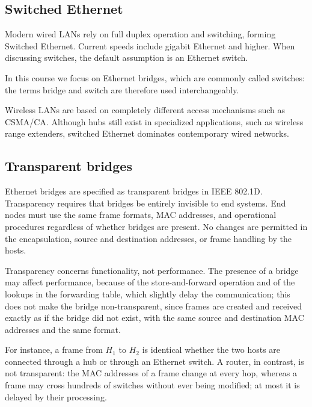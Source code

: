 \subsection{Switched Ethernet}

Modern wired LANs rely on full duplex operation and switching, forming Switched Ethernet. Current speeds include gigabit Ethernet and higher. When discussing switches, the default assumption is an Ethernet switch.

In this course we focus on Ethernet bridges, which are commonly called switches: the terms bridge and switch are therefore used interchangeably.

Wireless LANs are based on completely different access mechanisms such as CSMA/CA. Although hubs still exist in specialized applications, such as wireless range extenders, switched Ethernet dominates contemporary wired networks.

\subsection{Transparent bridges}

Ethernet bridges are specified as transparent bridges in IEEE 802.1D. Transparency requires that bridges be entirely invisible to end systems. End nodes must use the same frame formats, MAC addresses, and operational procedures regardless of whether bridges are present. No changes are permitted in the encapsulation, source and destination addresses, or frame handling by the hosts.


Transparency concerns functionality, not performance. The presence of a bridge may affect performance, because of the store-and-forward operation and of the lookups in the forwarding table, which slightly delay the communication; this does not make the bridge non-transparent, since frames are created and received exactly as if the bridge did not exist, with the same source and destination MAC addresses and the same format. 

\begin{center}
\end{center}

For instance, a frame from $H_1$ to $H_2$ is identical whether the two hosts are connected through a hub or through an Ethernet switch. A router, in contrast, is not transparent: the MAC addresses of a frame change at every hop, whereas a frame may cross hundreds of switches without ever being modified; at most it is delayed by their processing.
